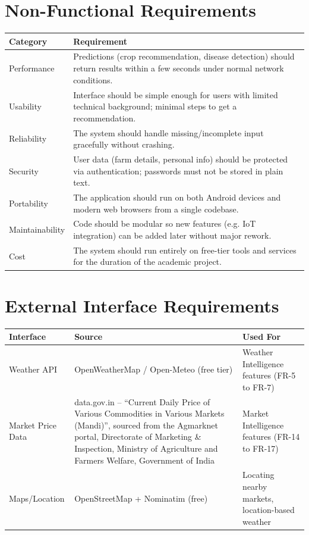 \documentclass[12pt,a4paper]{article}
\begin{document}
\section{Non-Functional Requirements}
\begin{longtable}{p{3.2cm} p{10.8cm}}
\toprule
\textbf{Category} & \textbf{Requirement} \\
\midrule
\endhead
Performance & Predictions (crop recommendation, disease detection) should return results within a few seconds under normal network conditions. \\
Usability & Interface should be simple enough for users with limited technical background; minimal steps to get a recommendation. \\
Reliability & The system should handle missing/incomplete input gracefully without crashing. \\
Security & User data (farm details, personal info) should be protected via authentication; passwords must not be stored in plain text. \\
Portability & The application should run on both Android devices and modern web browsers from a single codebase. \\
Maintainability & Code should be modular so new features (e.g. IoT integration) can be added later without major rework. \\
Cost & The system should run entirely on free-tier tools and services for the duration of the academic project. \\
\bottomrule
\end{longtable}

\section{External Interface Requirements}
\begin{longtable}{p{3.2cm} p{5.3cm} p{5.5cm}}
\toprule
\textbf{Interface} & \textbf{Source} & \textbf{Used For} \\
\midrule
\endhead
Weather API & OpenWeatherMap / Open-Meteo (free tier) & Weather Intelligence features (FR-5 to FR-7) \\
Market Price Data & data.gov.in -- ``Current Daily Price of Various Commodities in Various Markets (Mandi)'', sourced from the Agmarknet portal, Directorate of Marketing \& Inspection, Ministry of Agriculture and Farmers Welfare, Government of India & Market Intelligence features (FR-14 to FR-17) \\
Maps/Location & OpenStreetMap + Nominatim (free) & Locating nearby markets, location-based weather \\
\bottomrule
\end{longtable}
\end{document}
